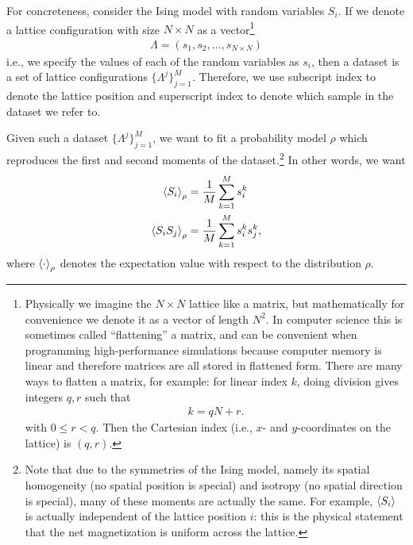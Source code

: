 \documentclass[11pt]{article}
\begin{document}
For concreteness, consider the Ising model with random variables \(S_{i}\). If
we denote a lattice configuration with size \(N \times N\) as a vector\footnote{Physically we imagine the \(N \times N\) lattice like a matrix, but
mathematically for convenience we denote it as a vector of length \(N^{2}\). In
computer science this is sometimes called ``flattening'' a matrix, and can be
convenient when programming high-performance simulations because computer memory is
linear and therefore matrices are all stored in flattened form. There are many
ways to flatten a matrix, for example: for linear index \(k\), doing division
gives integers \(q,r\) such that
\begin{align*}
k = qN + r.
\end{align*}
with \(0 \leq r < q\).
Then the Cartesian index (i.e., \(x\)- and \(y\)-coordinates on the lattice) is \((q,r)\).}
\begin{align*}
\Lambda = (s_{1}, s_{2}, \ldots, s_{N \times N})
\end{align*}
i.e., we specify the values of each of the random variables as \(s_{i}\), then a
dataset is a set of lattice configurations \(\{\Lambda^{j}\}_{j=1}^{M}\).
Therefore, we use subscript index to denote the lattice position and superscript
index to denote which sample in the dataset we refer to.

Given such a dataset \(\{\Lambda^{j}\}_{j=1}^{M}\), we want to fit a probability model \(\rho\)
which reproduces the first and second moments of the dataset.\footnote{Note that due to the symmetries of the Ising model, namely its spatial
homogeneity (no spatial position is special) and isotropy (no spatial direction
is special), many of these moments are actually the same. For example,
\(\ev{S_{i}}\) is actually independent of the lattice position \(i\): this
is the physical statement that the net magnetization is uniform across the
lattice.}
In other words, we want
\begin{align}
\label{eq:moments}
\begin{split}
\ev{S_{i}}_{\rho} &= \frac{1}{M}\sum_{k=1}^{M} s^{k}_{i} \\
\ev{S_{i} S_{j}}_{\rho} &= \frac{1}{M}\sum_{k=1}^{M} s_{i}^{k}s^{k}_{j},
\end{split}
\end{align}
where \(\ev{\cdot}_{\rho}\) denotes the expectation value with respect to the
distribution \(\rho\).
\end{document}
